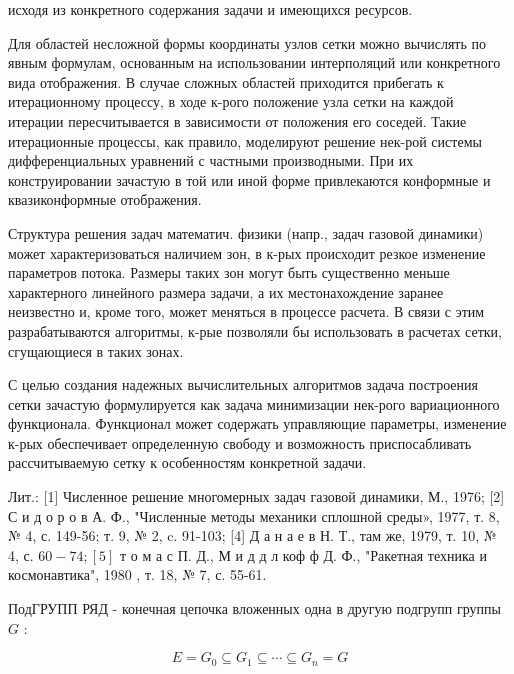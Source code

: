 \documentclass[10pt]{article}
\begin{document}
исходя из конкретного содержания задачи и имеющихся ресурсов.



Для областей несложной формы координаты узлов сетки можно вычислять по явным формулам, основанным на использовании интерполяций или конкретного вида отображения. В случае сложных областей приходится прибегать к итерационному процессу, в ходе к-рого положение узла сетки на каждой итерации пересчитывается в зависимости от положения его соседей. Такие итерационные процессы, как правило, моделируют решение нек-рой системы дифференциальных уравнений с частными производными. При их конструировании зачастую в той или иной форме привлекаются конформные и квазиконформные отображения.



Структура решения задач математич. физики (напр., задач газовой динамики) может характеризоваться наличием зон, в к-рых происходит резкое изменение параметров потока. Размеры таких зон могут быть существенно меньше характерного линейного размера задачи, а их местонахождение заранее неизвестно и, кроме того, может меняться в процессе расчета. В связи с этим разрабатываются алгоритмы, к-рые позволяли бы использовать в расчетах сетки, сгущающиеся в таких зонах.



С целью создания надежных вычислительных алгоритмов задача построения сетки зачастую формулируется как задача минимизации нек-рого вариационного функционала. Функционал может содержать управляющие параметры, изменение к-рых обеспечивает определенную свободу и возможность приспосабливать рассчитываемую сетку к особенностям конкретной задачи.



Лит.: [1] Численное решение многомерных задач газовой динамики, М., 1976; [2] С и д о р о в А. Ф., "Численные методы механики сплошной среды», 1977, т. 8, № 4, с. 149-56; т. 9, № 2, c. 91-103; [4] Д а н а е в Н. Т., там же, 1979, т. 10, № 4, с. $60-74 ;[5]$ т о м а с П. Д., М и д д л коф ф Д. Ф., "Ракетная техника и космонавтика", 1980 , т. 18, № 7, с. 55-61.



ПодГРУПП РЯД - конечная цепочка вложенных одна в другую подгрупп группы $G$ :



\[

E=G_{0} \subseteq G_{1} \subseteq \cdots \subseteq G_{n}=G

\]
\end{document}

